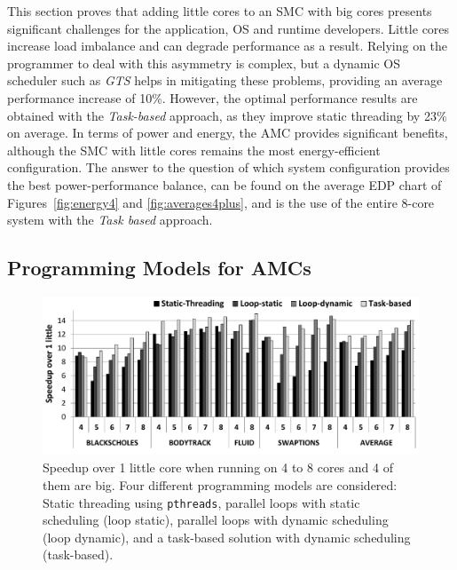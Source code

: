 This section proves that adding little cores to an SMC with big cores presents significant challenges for the application, OS and runtime developers. 
Little cores increase load imbalance and can degrade performance as a result. 
Relying on the programmer to deal with this asymmetry is complex, but a dynamic OS scheduler such as \emph{GTS} helps in mitigating these problems, providing an average performance increase of 10\%. 
However, the optimal performance results are obtained with the \emph{Task-based} approach, as they improve static threading by 23\% on average. 
In terms of power and energy, the AMC provides significant benefits, although the SMC with little cores remains the most energy-efficient configuration. 
The answer to the question of which system configuration provides the best power-performance balance, can be found on the average EDP chart of Figures~\ref{fig:energy4} and \ref{fig:averages4plus}, and is the use of the entire 8-core system with the \emph{Task based} approach.

\subsection{Programming Models for AMCs}

\begin{figure}
        \centering
        \includegraphics[width=\columnwidth]{figures/speedup-ompssVSopenmp}
        \vspace{-0.5cm}
        \caption{Speedup over 1 little core when running on 4 to 8 cores and 4 of them are big. 
Four different programming models are considered: Static threading using \texttt{pthreads}, 
parallel loops with static scheduling (loop static), parallel loops with dynamic scheduling (loop 
dynamic), and a task-based solution with dynamic scheduling (task-based).}%
        \label{fig:prog_models}%
        \vspace{-0.5cm}
\end{figure}

